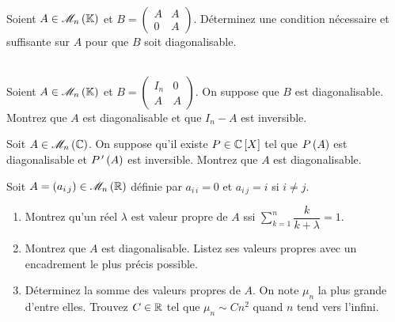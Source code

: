 \begin{exo}~\\
Soient \(A\in\M{n}\) et \(B=\begin{pmatrix}
A & A \\
0 & A
\end{pmatrix}\). Déterminez une condition nécessaire et suffisante sur \(A\) pour que \(B\) soit diagonalisable.
\end{exo}

\begin{corr}
\end{corr}

\begin{exo}~\\
Soient \(A\in\M{n}\) et \(B=\begin{pmatrix}
I_n & 0 \\
A & A
\end{pmatrix}\). On suppose que \(B\) est diagonalisable. Montrez que \(A\) est diagonalisable et que \(I_n-A\) est inversible.
\end{exo}

\begin{corr}
\end{corr}

\begin{exo}
Soit \(A\in\M{n}[\C]\). On suppose qu'il existe \(P\in\poly[\C]\) tel que \(P\left(A\right)\) est diagonalisable et \(P^{\,\prime}\left(A\right)\) est inversible. Montrez que \(A\) est diagonalisable.
\end{exo}

\begin{corr}
\end{corr}

\begin{exo}
Soit \(A=\paren{a_{i\,j}}\in\M{n}[\R]\) définie par \(a_{i\,i}=0\) et \(a_{i\,j}=i\) si \(i\not=j\).

\begin{enumerate}
    \item Montrez qu'un réel \(\lambda\) est valeur propre de \(A\) ssi \(\sum_{k=1}^n\dfrac{k}{k+\lambda}=1\). \\
    \item Montrez que \(A\) est diagonalisable. Listez ses valeurs propres avec un encadrement le plus précis possible. \\
    \item Déterminez la somme des valeurs propres de \(A\). On note \(\mu_n\) la plus grande d'entre elles. Trouvez \(C\in\mathbb{R}\) tel que \(\mu_n\sim Cn^2\) quand \(n\) tend vers l'infini.
\end{enumerate}
\end{exo}


